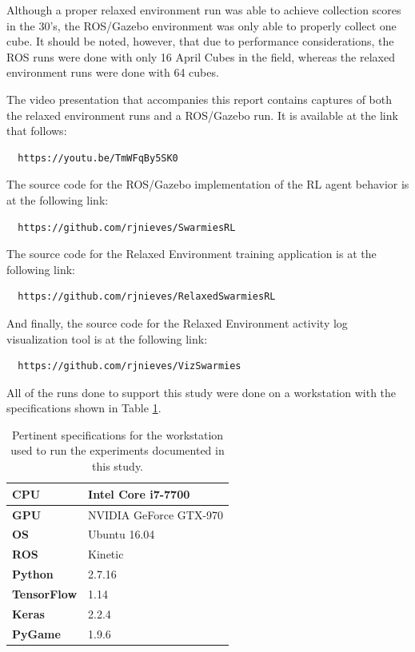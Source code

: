 \documentclass[sigconf,authordraft]{acmart}
\begin{document}
Although a proper relaxed environment run was able to achieve collection scores in the 30's, the ROS/Gazebo environment was only able to properly collect one cube. It should be noted, however, that due to performance considerations, the ROS runs were done with only 16 April Cubes in the field, whereas the relaxed environment runs were done with 64 cubes.

The video presentation that accompanies this report contains captures of both the relaxed environment runs and a ROS/Gazebo run. It is available at the link that follows:

\begin{verbatim}
  https://youtu.be/TmWFqBy5SK0
\end{verbatim}

The source code for the ROS/Gazebo implementation of the RL agent behavior is at the following link:

\begin{verbatim}
  https://github.com/rjnieves/SwarmiesRL
\end{verbatim}

The source code for the Relaxed Environment training application is at the following link:

\begin{verbatim}
  https://github.com/rjnieves/RelaxedSwarmiesRL
\end{verbatim}

And finally, the source code for the Relaxed Environment activity log visualization tool is at the following link:

\begin{verbatim}
  https://github.com/rjnieves/VizSwarmies
\end{verbatim}

All of the runs done to support this study were done on a workstation with the specifications shown in Table \ref{tab:workstation_specs}.

\begin{table}
  \centering
  \caption{Pertinent specifications for the workstation used to run the experiments documented in this study.}
  \label{tab:workstation_specs}
  \begin{tabular}{|l|l|}
    \hline\hline
    \textbf{CPU} & Intel Core i7-7700 \\
    \hline
    \textbf{GPU} & NVIDIA GeForce GTX-970 \\
    \hline
    \textbf{OS} & Ubuntu 16.04 \\
    \hline
    \textbf{ROS} & Kinetic \\
    \hline
    \textbf{Python} & 2.7.16 \\
    \hline
    \textbf{TensorFlow} & 1.14 \\
    \hline
    \textbf{Keras} & 2.2.4 \\
    \hline
    \textbf{PyGame} & 1.9.6 \\
    \hline\hline
  \end{tabular}
\end{table}
\end{document}
